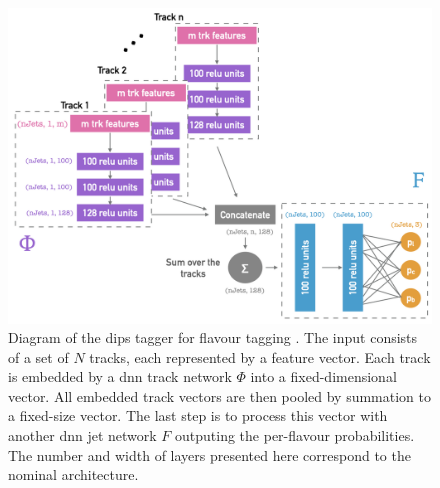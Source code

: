 \begin{figure}[h!]
  \center
  \includegraphics[scale=0.6]{Images/FTAG/dips_structure.png}
  \caption{Diagram of the \gls{dips} tagger for flavour tagging \cite{ATL-PHYS-PUB-2020-014}. The input consists of a set of $N$ tracks, each represented by a feature vector. Each track is embedded by a \gls{dnn} track network $\Phi$ into a fixed-dimensional vector. All embedded track vectors are then pooled by summation to a fixed-size vector. The last step is to process this vector with another \gls{dnn} jet network $F$ outputing the per-flavour probabilities. The number and width of layers presented here correspond to the nominal architecture.} 
  \label{fig:dipsModel}
\end{figure}

